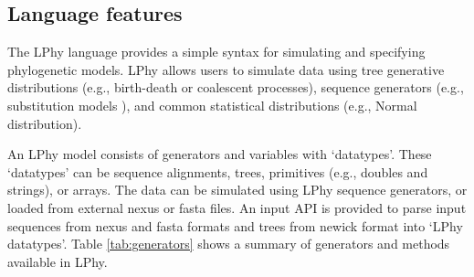 \documentclass[10pt,letterpaper,table]{article}
\begin{document}
\subsection*{Language features}
The LPhy language provides a simple syntax for simulating and specifying phylogenetic models.
LPhy allows users to simulate data using tree generative distributions (e.g., birth-death or coalescent processes), sequence generators (e.g., substitution models \cite{gtr}), and common statistical distributions (e.g., Normal distribution). %

An LPhy model consists of generators and variables with `datatypes'. 
These `datatypes' can be sequence alignments, trees, primitives (e.g., doubles and strings), or arrays. 
The data can be simulated using LPhy sequence generators, or loaded from external nexus or fasta files. 
An input API is provided to parse input sequences from nexus and fasta formats and trees from newick format into `LPhy datatypes'. 
Table \ref{tab:generators} shows a summary of generators and methods available in LPhy. 
\end{document}
